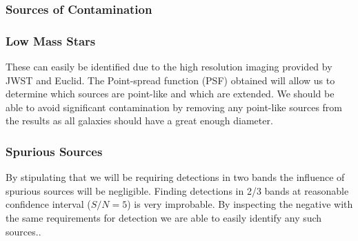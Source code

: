     	\subsubsection{Sources of Contamination} %
    	\label{ssub:sources_of_contamination}

		    \subsubsection*{Low Mass Stars} %
		    \label{sub:low_mass_stars}
		        These can easily be identified due to the high resolution imaging provided by JWST and Euclid. The Point-spread function (PSF) obtained will allow us to determine which sources are point-like and which are extended. We should be able to avoid significant contamination by removing any point-like sources from the results as all galaxies should have a great enough diameter.

		    \subsubsection*{Spurious Sources} %
		    \label{sub:spurious_sources}
		        By stipulating that we will be requiring detections in two bands the influence of spurious sources will be negligible. Finding detections in 2/3 bands at reasonable confidence interval ($S/N =5$) is very improbable. By inspecting the negative with the same requirements for detection we are able to easily identify any such sources.\cite{Bouwens2011}.

